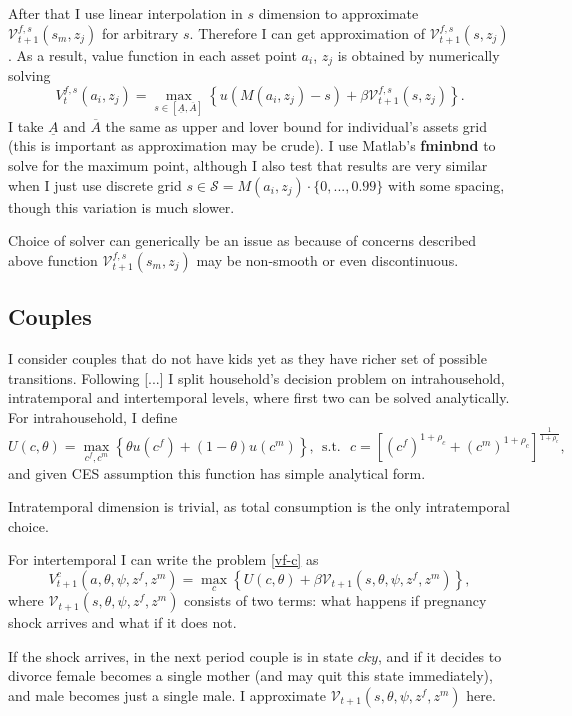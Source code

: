\documentclass[12pt,letter]{article}
\begin{document}
After that I use linear interpolation in $s$ dimension to approximate $\mathcal{V}^{f,s}_{t+1}(s_m,z_j)$ for arbitrary $s$. Therefore I can get approximation of $\mathcal{V}^{f,s}_{t+1}(s,z_j)$. As a result, value function in each asset point $a_i$, $z_j$ is obtained by numerically solving
\[V^{f,s}_t(a_i,z_j) = \max\limits_{s \in [\underline{A},\overline{A}]} \left\{ u(M(a_i,z_j) - s) + \beta \mathcal{V}^{f,s}_{t+1}(s,z_j)\right\}.\]
I take $\underline{A}$ and $\overline{A}$ the same as upper and lover bound for individual's assets grid (this is important as approximation may be crude). I use Matlab's \textbf{fminbnd} to solve for the maximum point, although I also test that results are very similar when I just use discrete grid $s \in \mathcal{S} = M(a_i,z_j) \cdot\{0,...,0.99\}$ with some spacing, though this variation is much slower.

Choice of solver can generically be an issue as because of concerns described above function $\mathcal{V}^{f,s}_{t+1}(s_m,z_j)$ may be non-smooth or even discontinuous.

\subsection{Couples}
I consider couples that do not have kids yet as they have richer set of possible transitions.  Following [...] I split household's decision problem on intrahousehold, intratemporal and intertemporal levels, where first two can be solved analytically. For intrahousehold, I define
\[U(c,\theta) = \max\limits_{c^f,c^m} \left\{\theta u(c^f)  + (1-\theta)u(c^m) \right\}, \ \ \text{s.t.} \ \ \ c = \left[ (c^f)^{1+\rho_c} + (c^m)^{1+\rho_c}\right]^{\frac1{1+\rho_c}},\]
and given CES assumption this function has simple analytical form.

Intratemporal dimension is trivial, as total consumption is the only intratemporal choice.

For intertemporal I can write the problem \ref{vf-c} as
\[V^{c}_{t+1}(a,\theta,\psi,z^f,z^m) = \max\limits_{c} \left\{ U(c,\theta) + \beta \mathcal{V}_{t+1}(s,\theta,\psi,z^f,z^m) \right\},\]
where $\mathcal{V}_{t+1}(s,\theta,\psi,z^f,z^m)$ consists of two terms: what happens if pregnancy shock arrives and what if it does not.

If the shock arrives, in the next period couple is in state $cky$, and if it decides to divorce female becomes a single mother (and may quit this state immediately), and male becomes just a single male. I approximate $\mathcal{V}_{t+1}(s,\theta,\psi,z^f,z^m)$ here. 
\end{document}
